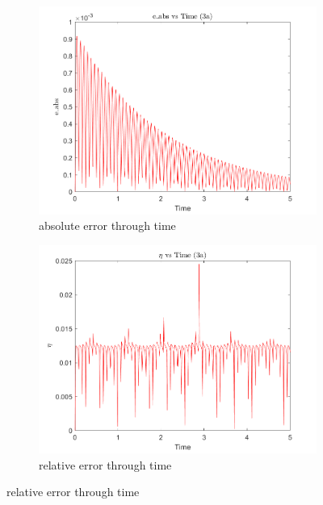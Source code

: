 \documentclass[a4paper,12pt]{article}
\begin{document}
\begin{figure}[h]
  \centering
  \begin{subfigure}[b]{0.5\textwidth}
      \includegraphics[width=\textwidth]{../../Matlab/task3a_plots/e_abs_vs_time.png}
      \caption{absolute error through time}
      \label{fig:image4}
  \end{subfigure}
  \hspace{-1.0em}%
  \begin{subfigure}[b]{0.5\textwidth}
      \includegraphics[width=\textwidth]{../../Matlab/task3a_plots/eta_vs_time.png}
      \caption{relative error through time}
      \label{fig:image5}
  \end{subfigure}


\end{figure}
\end{document}
